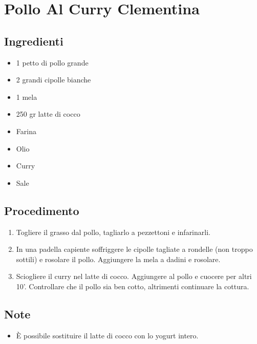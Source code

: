 \section{Pollo Al Curry Clementina}
\subsection{Ingredienti}
\begin{itemize}
\item 1 petto di pollo grande   
\item 2 grandi cipolle bianche  
\item 1 mela  
\item 250 gr latte di cocco  
\item Farina  
\item Olio  
\item Curry  
\item Sale
\end{itemize}
\subsection{Procedimento}
\begin{enumerate}
\item  Togliere il grasso dal pollo, tagliarlo a pezzettoni e infarinarli.  
\item  In una padella capiente soffriggere le cipolle tagliate a rondelle (non troppo sottili) e rosolare il pollo. Aggiungere la mela a dadini e rosolare.  
\item  Sciogliere il curry nel latte di cocco. Aggiungere al pollo e cuocere per altri 10'. Controllare che il pollo sia ben cotto, altrimenti continuare la cottura.
\end{enumerate}
\subsection{Note}
\begin{itemize}
\item È possibile sostituire il latte di cocco con lo yogurt intero.
\end{itemize}
